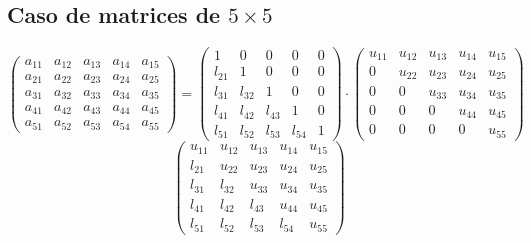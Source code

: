 \documentclass[10pt,a4paper,dvipdfmx]{article}
\begin{document}
\subsection{Caso de matrices de $5\times 5$ }
$$ \left( 
\begin{array}{ccccc}
a_{{1}{1}} & a_{{1}{2}} & a_{{1}{3}} & a_{{1}{4}} & a_{{1}{5}} \\
a_{{2}{1}} & a_{{2}{2}} & a_{{2}{3}} & a_{{2}{4}} & a_{{2}{5}} \\
a_{{3}{1}} & a_{{3}{2}} & a_{{3}{3}} & a_{{3}{4}} & a_{{3}{5}} \\
a_{{4}{1}} & a_{{4}{2}} & a_{{4}{3}} & a_{{4}{4}} & a_{{4}{5}} \\
a_{{5}{1}} & a_{{5}{2}} & a_{{5}{3}} & a_{{5}{4}} & a_{{5}{5}} 
 \end{array}
\right)
 = \left( 
\begin{array}{ccccc}
1 & 0 & 0 & 0 & 0 \\
l_{{2}{1}} & 1 & 0 & 0 & 0 \\
l_{{3}{1}} & l_{{3}{2}} & 1 & 0 & 0 \\
l_{{4}{1}} & l_{{4}{2}} & l_{{4}{3}} & 1 & 0 \\
l_{{5}{1}} & l_{{5}{2}} & l_{{5}{3}} & l_{{5}{4}} & 1 
 \end{array}
\right)
 \cdot \left( 
\begin{array}{ccccc}
u_{{1}{1}} & u_{{1}{2}} & u_{{1}{3}} & u_{{1}{4}} & u_{{1}{5}} \\
0 & u_{{2}{2}} & u_{{2}{3}} & u_{{2}{4}} & u_{{2}{5}} \\
0 & 0 & u_{{3}{3}} & u_{{3}{4}} & u_{{3}{5}} \\
0 & 0 & 0 & u_{{4}{4}} & u_{{4}{5}} \\
0 & 0 & 0 & 0 & u_{{5}{5}} 
 \end{array}
\right)
 $$
$$ \left( 
\begin{array}{ccccc}
u_{{1}{1}} & u_{{1}{2}} & u_{{1}{3}} & u_{{1}{4}} & u_{{1}{5}} \\
l_{{2}{1}} & u_{{2}{2}} & u_{{2}{3}} & u_{{2}{4}} & u_{{2}{5}} \\
l_{{3}{1}} & l_{{3}{2}} & u_{{3}{3}} & u_{{3}{4}} & u_{{3}{5}} \\
l_{{4}{1}} & l_{{4}{2}} & l_{{4}{3}} & u_{{4}{4}} & u_{{4}{5}} \\
l_{{5}{1}} & l_{{5}{2}} & l_{{5}{3}} & l_{{5}{4}} & u_{{5}{5}} 
 \end{array}
\right)
 $$
\end{document}
